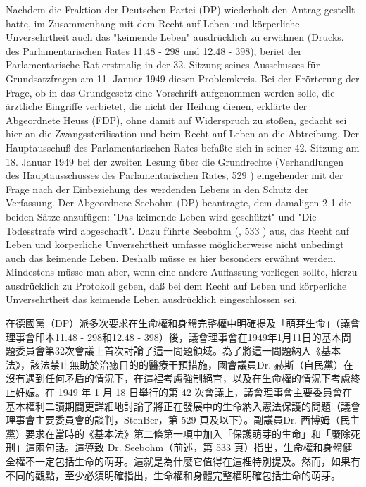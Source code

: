 \documentclass[12pt]{article}
\begin{document}
\syncleft
\begin{sourcepara}
Nachdem die Fraktion der Deutschen Partei (DP) wiederholt den Antrag gestellt hatte, im Zusammenhang mit dem Recht auf Leben und körperliche Unversehrtheit auch das "keimende Leben" ausdrücklich zu erwähnen (Drucks. des Parlamentarischen Rates 11.48 - 298 und 12.48 - 398), beriet der Parlamentarische Rat erstmalig in der 32. Sitzung seines Ausschusses für Grundsatzfragen am 11. Januar 1949 diesen Problemkreis. Bei der Erörterung der Frage, ob in das Grundgesetz eine Vorschrift aufgenommen werden solle, die ärztliche Eingriffe verbietet, die nicht der Heilung dienen, erklärte der Abgeordnete \abbrDr{} Heuss (FDP), ohne damit auf Widerspruch zu stoßen, gedacht sei hier an die Zwangssterilisation und beim Recht auf Leben an die Abtreibung. Der Hauptausschuß des Parlamentarischen Rates befaßte sich in seiner 42. Sitzung am 18. Januar 1949 bei der zweiten Lesung über die Grundrechte (Verhandlungen des Hauptausschusses des Parlamentarischen Rates, \abbrStenBer{} \abbrS{} 529 \abbrFF{}) eingehender mit der Frage nach der Einbeziehung des werdenden Lebens in den Schutz der Verfassung. Der Abgeordnete \abbrDr{} Seebohm (DP) beantragte, dem damaligen \abbrArt{} 2 \abbrAbs{} 1 \abbrGG{} die beiden Sätze anzufügen: "Das keimende Leben wird geschützt" und "Die Todesstrafe wird abgeschafft". Dazu führte \abbrDr{} Seebohm (\abbrAAO{}, \abbrS{} 533 \abbrF{}) aus, das Recht auf Leben und körperliche Unversehrtheit umfasse möglicherweise nicht unbedingt auch das keimende Leben. Deshalb müsse es hier besonders erwähnt werden. Mindestens müsse man aber, wenn eine andere Auffassung vorliegen sollte, hierzu ausdrücklich zu Protokoll geben, daß bei dem Recht auf Leben und körperliche Unversehrtheit das keimende Leben ausdrücklich eingeschlossen sei.
\end{sourcepara}
\begin{transpara}
在德國黨（DP）派多次要求在生命權和身體完整權中明確提及「萌芽生命」（議會理事會印本11.48 - 298和12.48 - 398）後，議會理事會在1949年1月11日的基本問題委員會第32次會議上首次討論了這一問題領域。為了將這一問題納入《基本法》，該法禁止無助於治癒目的的醫療干預措施，國會議員Dr. 赫斯（自民黨）在沒有遇到任何矛盾的情況下，在這裡考慮強制絕育，以及在生命權的情況下考慮終止妊娠。在 1949 年 1 月 18 日舉行的第 42 次會議上，議會理事會主要委員會在基本權利二讀期間更詳細地討論了將正在發展中的生命納入憲法保護的問題（議會理事會主要委員會的談判，StenBer，第 529 頁及以下）。副議員Dr. 西博姆（民主黨）要求在當時的《基本法》第二條第一項中加入「保護萌芽的生命」和「廢除死刑」這兩句話。這導致 Dr. Seebohm（前述，第 533 頁）指出，生命權和身體健全權不一定包括生命的萌芽。這就是為什麼它值得在這裡特別提及。然而，如果有不同的觀點，至少必須明確指出，生命權和身體完整權明確包括生命的萌芽。
\end{transpara}
\end{document}
